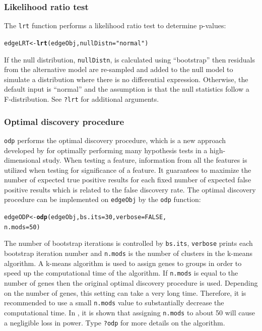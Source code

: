 \documentclass{article}\usepackage[]{graphicx}\usepackage[]{color}
\makeatletter
\newcommand{\hlnum}[1]{\textcolor[rgb]{0.686,0.059,0.569}{#1}}%
\newcommand{\hlstr}[1]{\textcolor[rgb]{0.192,0.494,0.8}{#1}}%
\newcommand{\hlstd}[1]{\textcolor[rgb]{0.345,0.345,0.345}{#1}}%
\newcommand{\hlkwb}[1]{\textcolor[rgb]{0.69,0.353,0.396}{#1}}%
\newcommand{\hlkwc}[1]{\textcolor[rgb]{0.333,0.667,0.333}{#1}}%
\newcommand{\hlkwd}[1]{\textcolor[rgb]{0.737,0.353,0.396}{\textbf{#1}}}%
\newenvironment{kframe}{%
 \def\at@end@of@kframe{}%
 \ifinner\ifhmode%
  \def\at@end@of@kframe{\end{minipage}}%
  \begin{minipage}{\columnwidth}%
 \fi\fi%
 \def\FrameCommand##1{\hskip\@totalleftmargin \hskip-\fboxsep
 \colorbox{shadecolor}{##1}\hskip-\fboxsep
     \hskip-\linewidth \hskip-\@totalleftmargin \hskip\columnwidth}%
 \MakeFramed {\advance\hsize-\width
   \@totalleftmargin\z@ \linewidth\hsize
   \@setminipage}}%
 {\par\unskip\endMakeFramed%
 \at@end@of@kframe}
\newenvironment{knitrout}{}{} %
\makeatother
\begin{document}
\subsubsection{Likelihood ratio test}
The {\tt lrt} function performs a likelihood ratio test to determine p-values:
\begin{knitrout}
\color{fgcolor}\begin{kframe}
\begin{alltt}
\hlstd{edgeLRT} \hlkwb{<-} \hlkwd{lrt}\hlstd{(edgeObj,} \hlkwc{nullDistn} \hlstd{=} \hlstr{"normal"}\hlstd{)}
\end{alltt}
\end{kframe}
\end{knitrout}
If the null distribution, {\tt nullDistn}, is calculated using ``bootstrap'' then residuals from the alternative model are re-sampled and added to the null model to simulate a distribution where there is no differential expression. Otherwise, the default input is ``normal'' and the assumption is that the null statistics follow a F-distribution. See {\tt ?lrt} for additional arguments.

\subsubsection{Optimal discovery procedure}
{\tt odp} performs the optimal discovery procedure, which is a new approach developed by \cite{storey:2005} for optimally performing many hypothesis tests in a high-dimensional study. When testing a feature, information from all the features is utilized when testing for significance of a feature. It guarantees to maximize the number of expected true positive results for each fixed number of expected false positive results which is related to the false discovery rate. The optimal discovery procedure can be implemented on {\tt edgeObj} by the {\tt odp} function:
\begin{knitrout}
\color{fgcolor}\begin{kframe}
\begin{alltt}
\hlstd{edgeODP} \hlkwb{<-} \hlkwd{odp}\hlstd{(edgeObj,} \hlkwc{bs.its} \hlstd{=} \hlnum{30}\hlstd{,} \hlkwc{verbose} \hlstd{=} \hlnum{FALSE}\hlstd{,}
    \hlkwc{n.mods} \hlstd{=} \hlnum{50}\hlstd{)}
\end{alltt}
\end{kframe}
\end{knitrout}
The number of bootstrap iterations is controlled by {\tt bs.its}, {\tt verbose} prints each bootstrap iteration number and {\tt n.mods} is the number of clusters in the k-means algorithm. A k-means algorithm is used to assign genes to groups in order to speed up the computational time of the algorithm. If {\tt n.mods} is equal to the number of genes then the original optimal discovery procedure is used. Depending on the number of genes, this setting can take a very long time.  Therefore, it is recommended to use a small {\tt n.mods} value to substantially decrease the computational time. In \cite{woo:leek:storey:2011}, it is shown that assigning {\tt n.mods} to about 50 will cause a negligible loss in power. Type {\tt ?odp} for more details on the algorithm.
\end{document}
